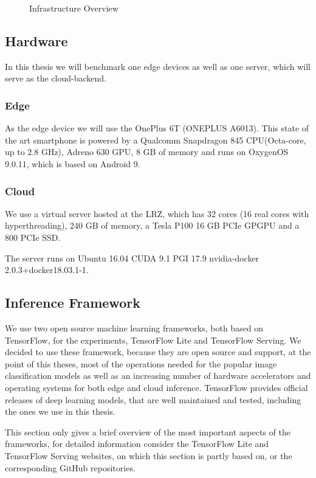 \begin{figure}[H]
\centering
\resizebox{.95\linewidth}{!}{}
\caption{Infrastructure Overview}
\label{fig:expDesign}
\end{figure}


\subsection{Hardware}
In this thesis we will benchmark one edge devices as well as one server, which will serve as the cloud-backend.
\subsubsection{Edge}
\label{chap:hardwareEdge}
As the edge device we will use the OnePlus 6T (ONEPLUS A6013). This state of the art smartphone is powered by a Qualcomm Snapdragon 845 CPU(Octa-core, up to 2.8 GHz), Adreno 630 GPU, 8 GB of memory and runs on OxygenOS 9.0.11, which is based on Android 9.
\subsubsection{Cloud}
We use a virtual server hosted at the LRZ, which has 32 cores (16 real cores with hyperthreading), 240 GB of memory, a Tesla P100 16 GB PCIe GPGPU and a 800 PCIe SSD.

The server runs on Ubuntu 16.04 CUDA 9.1 PGI 17.9 nvidia-docker 2.0.3+docker18.03.1-1.
\subsection{Inference Framework}
We use two open source machine learning frameworks, both based on TensorFlow, for the experiments, TensorFlow Lite and TensorFlow Serving. We decided to use these framework, because they are open source and support, at the point of this theses, most of the operations needed for the popular image classification models as well as an increasing number of hardware accelerators and operating systems for both edge and cloud inference.
TensorFlow provides official releases of deep learning models, that are well maintained and tested, including the ones we use in this thesis.

This section only gives a brief overview of the most important aspects of the frameworks, for detailed information consider the TensorFlow Lite\cite{tfLite}  and TensorFlow Serving\cite{tfServing} websites, on which this section is partly based on, or the corresponding GitHub repositories.
